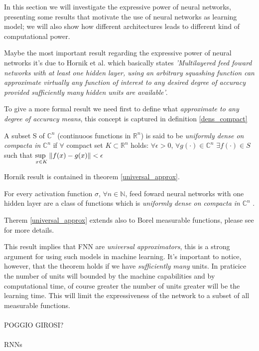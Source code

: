 In this section we will investigate the expressive power of neural networks, presenting some results that motivate the use of neural networks as learning
model; we will also show how different architectures leads to different kind of computational power.
 

Maybe the most important result regarding the expressive power of neural networks it's due to Hornik et al. \cite{Hornik89} which basically states
\textit{'Multilayered feed foward networks with at least one hidden layer, using an arbitrary squashing function can approximate virtually any function
of interest to any desired degree of accuracy provided sufficiently many hidden units are available'}.

To give a more formal result we need first to define what \textit{approximate to any degree of accuracy means}, this concept is captured in definition
\ref{dens_compact}
 
\begin{defn}
 A subset S of $\mathbb{C}^n$ (continuoos functions in $\mathbb{R}^n$) is said to be \textit{uniformly dense on compacta in} $\mathbb{C}^n$ if $\forall$
 compact set $K\subset \mathbb{R}^n$ holds: $\forall \epsilon >0$, $\forall g(\cdot) \in \mathbb{C}^n$ $\exists f(\cdot) \in S$ such that 
 $\underset{x \in K}{\text{sup  }} \left\Vert f(x)-g(x) \right\Vert<\epsilon$ 
 \label{dens_compact}
\end{defn}

Hornik result is contained in theorem \ref{universal_approx}.
\begin{thm}
 For every activation function $\sigma$, $\forall n\in \mathbb{N}$, feed foward neural
 networks with one hidden layer are a class of functions which is \textit{uniformly dense on compacta in} $\mathbb{C}^n$
\label{universal_approx}.
\end{thm}
Therem \ref{universal_approx} extends also to Borel measurable functions, please see \cite{Hornik89} for more details.


This result implies that FNN are \textit{universal approximators}, this is a strong argument for using such models in machine learning.
It's important to notice, however, that the theorem holds if we have \textit{sufficiently many} units. In praticice the number of units will bounded
by the machine capabilities and by computational time, of course greater the number of units greater will be the learning time. This will limit
the expressiveness of the network to a subset of all measurable functions.
\\\\POGGIO GIROSI?
\\\\RNNs

